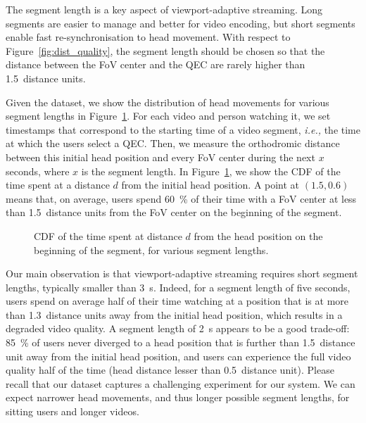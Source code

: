 The segment length is a key aspect of viewport-adaptive streaming.
Long segments are easier to manage and better for video encoding, but
short segments enable fast re-synchronisation to head movement. With
respect to Figure~\ref{fig:dist_quality}, the segment length
should be chosen so that the distance between the \ac{FoV} center and
the \ac{QEC} are rarely higher than \num{1.5}~distance units.

Given the dataset, we show the distribution of head movements for
various segment lengths in Figure~\ref{cdf-dataset}. For each video
and person watching it, we set timestamps that correspond to the
starting time of a video segment, \textit{i.e.,} the time at which the
users select a \ac{QEC}. Then, we measure the orthodromic distance
between this initial head position and every \ac{FoV} center during
the next $x$ seconds, where $x$ is the segment length. In
Figure~\ref{cdf-dataset}, we show the \ac{CDF} of the time spent at a
distance $d$ from the initial head position. A point at $(1.5,0.6)$
means that, on average, users spend \SI{60}{\percent} of their time
with a \ac{FoV} center at less than \num{1.5}~distance units from the
\ac{FoV} center on the beginning of the segment.

\begin{figure}[htbp]
\centering

\caption{CDF of the time spent at distance $d$ from the head position on the beginning of the
segment, for various segment lengths.}\label{cdf-dataset}
\end{figure}

Our main observation is that viewport-adaptive streaming requires
short segment lengths, typically smaller than \SI{3}{\second}. Indeed,
for a segment length of five seconds, users spend on average half of
their time watching at a position that is at more than
\num{1.3}~distance units away from the initial head position, which
results in a degraded video quality. A segment length of
\SI{2}{\second} appears to be a good trade-off: \SI{85}{\percent} of
users never diverged to a head position that is further than
\num{1.5}~distance unit away from the initial head position, and users
can experience the full video quality half of the time (head distance
lesser than \num{0.5}~distance unit). Please recall that our dataset
captures a challenging experiment for our system. We can expect
narrower head movements, and thus longer possible segment lengths, for
sitting users and longer videos.


